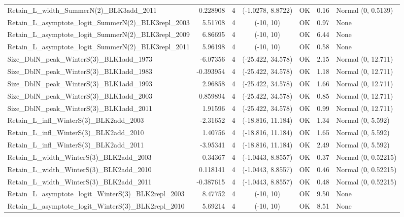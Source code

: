 \documentclass[12pt,]{article}
\begin{document}
\begin{landscape}
\begin{longtable}{lrcccll}
  Retain\_L\_width\_SummerN(2)\_BLK3add\_2011 & 0.228908 & 4 & (-1.0278, 8.8722) & OK & 0.16 & Normal (0, 0.5139) \\ 
  Retain\_L\_asymptote\_logit\_SummerN(2)\_BLK3repl\_2003 & 5.51708 & 4 & (-10, 10) & OK & 0.97 & None \\ 
  Retain\_L\_asymptote\_logit\_SummerN(2)\_BLK3repl\_2009 & 6.86695 & 4 & (-10, 10) & OK & 6.44 & None \\ 
  Retain\_L\_asymptote\_logit\_SummerN(2)\_BLK3repl\_2011 & 5.96198 & 4 & (-10, 10) & OK & 0.58 & None \\ 
  Size\_DblN\_peak\_WinterS(3)\_BLK1add\_1973 & -6.07356 & 4 & (-25.422, 34.578) & OK & 2.15 & Normal (0, 12.711) \\ 
  Size\_DblN\_peak\_WinterS(3)\_BLK1add\_1983 & -0.393954 & 4 & (-25.422, 34.578) & OK & 1.18 & Normal (0, 12.711) \\ 
  Size\_DblN\_peak\_WinterS(3)\_BLK1add\_1993 & 2.96858 & 4 & (-25.422, 34.578) & OK & 1.66 & Normal (0, 12.711) \\ 
  Size\_DblN\_peak\_WinterS(3)\_BLK1add\_2003 & 0.859894 & 4 & (-25.422, 34.578) & OK & 0.85 & Normal (0, 12.711) \\ 
  Size\_DblN\_peak\_WinterS(3)\_BLK1add\_2011 & 1.91596 & 4 & (-25.422, 34.578) & OK & 0.99 & Normal (0, 12.711) \\ 
  Retain\_L\_infl\_WinterS(3)\_BLK2add\_2003 & -2.31652 & 4 & (-18.816, 11.184) & OK & 1.34 & Normal (0, 5.592) \\ 
  Retain\_L\_infl\_WinterS(3)\_BLK2add\_2010 & 1.40756 & 4 & (-18.816, 11.184) & OK & 1.65 & Normal (0, 5.592) \\ 
  Retain\_L\_infl\_WinterS(3)\_BLK2add\_2011 & -3.95341 & 4 & (-18.816, 11.184) & OK & 2.49 & Normal (0, 5.592) \\ 
  Retain\_L\_width\_WinterS(3)\_BLK2add\_2003 & 0.34367 & 4 & (-1.0443, 8.8557) & OK & 0.37 & Normal (0, 0.52215) \\ 
  Retain\_L\_width\_WinterS(3)\_BLK2add\_2010 & 0.118141 & 4 & (-1.0443, 8.8557) & OK & 0.46 & Normal (0, 0.52215) \\ 
  Retain\_L\_width\_WinterS(3)\_BLK2add\_2011 & -0.387615 & 4 & (-1.0443, 8.8557) & OK & 0.48 & Normal (0, 0.52215) \\ 
  Retain\_L\_asymptote\_logit\_WinterS(3)\_BLK2repl\_2003 & 8.47752 & 4 & (-10, 10) & OK & 9.50 & None \\ 
  Retain\_L\_asymptote\_logit\_WinterS(3)\_BLK2repl\_2010 & 5.69214 & 4 & (-10, 10) & OK & 8.51 & None \\ 

\end{longtable}
\end{landscape}
\end{document}
